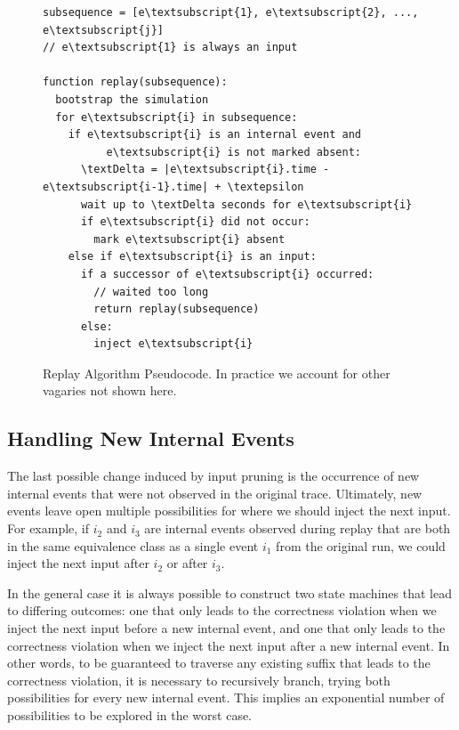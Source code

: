 \begin{figure}
\begin{boxedminipage}{\linewidth}
\begin{Verbatim}[commandchars=\\\{\}]
subsequence = [e\textsubscript{1}, e\textsubscript{2}, ..., e\textsubscript{j}]
// e\textsubscript{1} is always an input

function replay(subsequence):
  bootstrap the simulation
  for e\textsubscript{i} in subsequence:
    if e\textsubscript{i} is an internal event and
          e\textsubscript{i} is not marked absent:
      \textDelta = |e\textsubscript{i}.time - e\textsubscript{i-1}.time| + \textepsilon
      wait up to \textDelta seconds for e\textsubscript{i}
      if e\textsubscript{i} did not occur:
        mark e\textsubscript{i} absent
    else if e\textsubscript{i} is an input:
      if a successor of e\textsubscript{i} occurred:
        // waited too long
        return replay(subsequence)
      else:
        inject e\textsubscript{i}
\end{Verbatim}
\end{boxedminipage}
\caption{Replay Algorithm Pseudocode. In practice we account for other
vagaries not shown here. }
\label{fig:peek}
\end{figure}

\subsection{Handling New Internal Events}
\label{subsec:new_events}

The last possible change induced by input pruning is the occurrence of new
internal events that were not observed in the original trace.
Ultimately, new events leave open multiple possibilities for where
we should inject the next input.
For example, if $i_2$ and $i_3$ are internal events observed
during replay that are both in the same equivalence class as a single event $i_1$ from the
original run, we could inject the next input after $i_2$ or after $i_3$.

In the general case it is always possible to construct two state machines that lead
to differing outcomes: one that only leads to the correctness violation when
we inject the next input
before a new internal event, and one that only leads to the
correctness violation when we inject the next input after a new internal
event. In other words, to be guaranteed to traverse any existing suffix that leads
to the correctness violation, it is necessary to recursively branch, trying both
possibilities for every new internal event. This implies an exponential number of
possibilities to be explored in the worst case.

